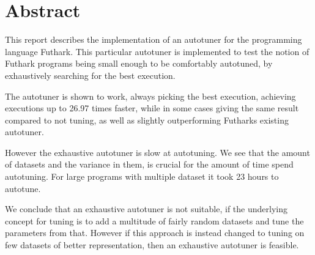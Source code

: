 \section*{Abstract}
This report describes the implementation of an autotuner for the programming language Futhark. This particular autotuner is implemented to test the notion of Futhark programs being small enough to be comfortably autotuned, by exhaustively searching for the best execution. 

The autotuner is shown to work, always picking the best execution, achieving executions up to 26.97 times faster, while in some cases giving the same result compared to not tuning, as well as slightly outperforming Futharks existing autotuner. 

However the exhaustive autotuner is slow at autotuning. We see that the amount of datasets and the variance in them, is crucial for the amount of time spend autotuning. For large programs with multiple dataset it took 23 hours to autotune. 

We conclude that an exhaustive autotuner is not suitable, if the underlying concept for tuning
is to add a multitude of fairly random datasets and tune the parameters from that. 
However if this approach is instead changed to tuning on few datasets of better representation,
then an exhaustive autotuner is feasible. 

\begin{comment}
While we present an optimization for the implementation, and present a way to possibly mitigate the variance and amount of datasets, we conclude that, currently, exhaustively autotuning Futhark is not comfortable due to the long time required to do so.
\end{comment}

